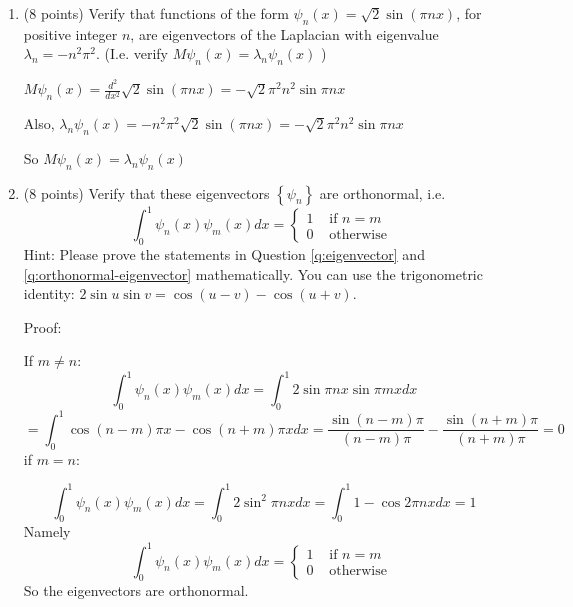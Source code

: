 \documentclass[10pt]{article}
\begin{document}
\begin{enumerate}[label=2.\arabic*]
    \item (8 points) \label{q:eigenvector}
    Verify that functions of the form $\psi_{n}(x)=\sqrt{2} \sin (\pi n x)$,
    for positive integer $n$, are eigenvectors of the Laplacian with eigenvalue $\lambda_{n}=-n^{2} \pi^{2}$.
    (I.e. verify $M \psi_{n}(x)=\lambda_{n} \psi_{n}(x)$ )\par
    $M \psi_{n}(x)=\frac{d^{2}}{d x^{2}}\sqrt{2} \sin (\pi n x)=-\sqrt{2}\pi^2n^2\sin{\pi nx}$\par
    Also, $\lambda_{n} \psi_{n}(x)=-n^2\pi^2\sqrt{2} \sin (\pi n x)=-\sqrt{2}\pi^2n^2\sin{\pi nx}$\par
	So $M \psi_{n}(x)=\lambda_{n} \psi_{n}(x)$\par
    \item (8 points) \label{q:orthonormal-eigenvector}
    Verify that these eigenvectors $\left\{\psi_{n}\right\}$ are orthonormal, i.e.
\begin{equation}
    \int_{0}^{1} \psi_{n}(x) \psi_{m}(x) d x=
    \left\{\begin{array}{ll}
        1 & \text { if } n=m \\
        0 & \text { otherwise }
    \end{array}\right.
\end{equation}
Hint: Please prove the statements in Question \ref{q:eigenvector} and \ref{q:orthonormal-eigenvector} mathematically. You can use the trigonometric identity: $2\sin u \sin v = \cos (u-v) - \cos (u+v)$.\par
Proof:\par
If $m \neq n:$
\begin{equation}
\int_{0}^{1} \psi_{n}(x) \psi_{m}(x) d x=\int_{0}^{1} 2\sin{\pi nx}\sin{\pi mx} d x 
\end{equation}
\begin{equation}
= \int_{0}^{1}\cos{(n-m)\pi x}- \cos{(n+m)\pi x} d x=\frac{\sin{(n-m)\pi}}{(n-m)\pi} - \frac{\sin{(n+m)\pi}}{(n+m)\pi}=0
\end{equation}
if $m=n$:\par
\begin{equation}
\int_{0}^{1} \psi_{n}(x) \psi_{m}(x) d x=\int_{0}^{1} 2\sin^2{\pi nx} d x = \int_{0}^{1} 1-\cos{2\pi nx} d x =1
\end{equation}
Namely 
\begin{equation}
\int_{0}^{1} \psi_{n}(x) \psi_{m}(x) d x=
\left\{\begin{array}{ll}
1 & \text { if } n=m \\
0 & \text { otherwise }
\end{array}\right.
\end{equation}
So the eigenvectors are orthonormal.
\end{enumerate}
\end{document}
